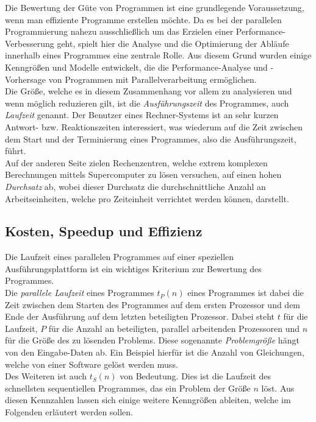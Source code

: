 		Die Bewertung der Güte von Programmen ist eine grundlegende Voraussetzung, wenn man effiziente Programme erstellen möchte. Da es bei der parallelen Programmierung nahezu ausschließlich um das Erzielen einer Performance-Verbesserung geht, spielt hier die Analyse und die Optimierung der Abläufe innerhalb eines Programmes eine zentrale Rolle. Aus diesem Grund wurden einige Kenngrößen und Modelle entwickelt, die die Performance-Analyse und -Vorhersage von Programmen mit Parallelverarbeitung ermöglichen.\\
		Die Größe, welche es in diesem Zusammenhang vor allem zu analysieren und wenn möglich reduzieren gilt, ist die \textit{Ausführungszeit} des Programmes, auch \textit{Laufzeit} genannt. Der Benutzer eines Rechner-Systems ist an sehr kurzen Antwort- bzw. Reaktionszeiten interessiert, was wiederum auf die Zeit zwischen dem Start und der Terminierung eines Programmes, also die Ausführungszeit, führt.\\
		Auf der anderen Seite zielen Rechenzentren, welche extrem komplexen Berechnungen mittels Supercomputer zu lösen versuchen, auf einen hohen \textit{Durchsatz} ab, wobei dieser Durchsatz die durchschnittliche Anzahl an Arbeitseinheiten, welche pro Zeiteinheit verrichtet werden können, darstellt.
		
		\subsection{Kosten, Speedup und Effizienz}
		
			Die Laufzeit eines parallelen Programmes auf einer speziellen Ausführungsplattform ist ein wichtiges Kriterium zur Bewertung des Programmes.\\
			Die \textit{parallele Laufzeit} eines Programmes $t_P(n)$ eines Programmes ist dabei die Zeit zwischen dem Starten des Programmes auf dem ersten Prozessor und dem Ende der Ausführung auf dem letzten beteiligten Prozessor. Dabei steht $t$ für die Laufzeit, $P$ für die Anzahl an beteiligten, parallel arbeitenden Prozessoren und $n$ für die Größe des zu lösenden Problems. Diese sogenannte \textit{Problemgröße} hängt von den Eingabe-Daten ab. Ein Beispiel hierfür ist die Anzahl von Gleichungen, welche von einer Software gelöst werden muss.\\
			Des Weiteren ist auch $t_S(n)$ von Bedeutung. Dies ist die Laufzeit des schnellsten sequentiellen Programmes, das ein Problem der Größe $n$ löst.
			Aus diesen Kennzahlen lassen sich einige weitere Kenngrößen ableiten, welche im Folgenden erläutert werden sollen.\\
			
